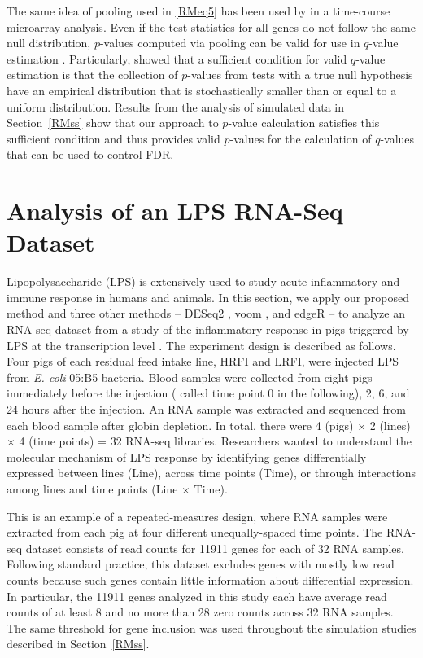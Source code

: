 The same idea of
pooling used in \eqref{RMeq5}
has been used by \citet{storey2005} in a time-course microarray analysis. Even if the test statistics for all genes do not follow the same null distribution, $p$-values computed via pooling can be valid for use in $q$-value estimation \citep{storey2004}. Particularly, \cite{storey2004} showed that a sufficient condition for valid $q$-value estimation is that the collection of $p$-values from tests with a true null hypothesis have an empirical distribution that is stochastically smaller than or equal to a uniform distribution.
Results from the analysis of simulated data in Section~\ref{RMss} show that our approach to $p$-value calculation satisfies this sufficient condition and thus provides valid $p$-values for the calculation of $q$-values that can be used to control FDR.

\section{Analysis of an LPS RNA-Seq Dataset}\label{RMdataanalysis}
Lipopolysaccharide (LPS) is extensively used to study acute inflammatory and immune response in humans and animals.  In this section, we  apply our proposed method and three other methods -- DESeq2 \citep{love2014}, voom \citep{law2014}, and  edgeR \citep{Robinson2010a, lun2016} --
to analyze an RNA-seq dataset  from  a study of the inflammatory response in pigs triggered by LPS at the transcription level \citep[Chapter~2]{liu2017}. The experiment design is described as follows. Four pigs of each residual feed intake line, HRFI and LRFI, were injected %
LPS from \emph{E. coli} 05:B5 bacteria. Blood samples  were collected from eight pigs immediately before the injection (%
called time point 0 in the following), 2, 6, and 24 hours after the injection. An RNA sample was extracted and sequenced from each blood sample after globin depletion. In total,  there were 4 (pigs) $\times$ 2 (lines) $\times$ 4 (time points) = 32 RNA-seq libraries. Researchers wanted to understand the molecular mechanism of LPS response by identifying genes differentially expressed between lines (Line), across time points (Time),  or through interactions among lines and time points (Line $\times$ Time).

This is an example of a repeated-measures design, where RNA samples were extracted from each pig at four different unequally-spaced time points. The RNA-seq dataset consists of read counts for 11911 genes for each of 32 RNA samples. Following standard practice, this dataset excludes genes with mostly low read counts because such genes contain little information about differential expression. In particular,  the 11911 genes analyzed in this study each have average read counts of at least 8 and no more than 28 zero counts across 32 RNA samples. The same threshold for gene inclusion was used throughout the simulation studies described in Section~\ref{RMss}.


